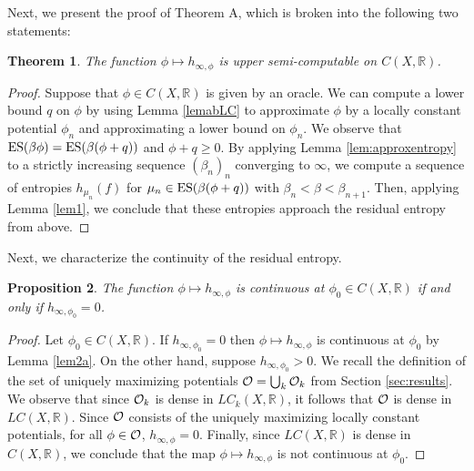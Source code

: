 \documentclass[11pt, reqno]{amsart}
\newtheorem{theorem}{Theorem}[section]
\newtheorem{proposition}[theorem]{Proposition}
\newcommand{\bR}{{\mathbb R}}
\def\ES{{\rm ES}}
\begin{document}
Next, we present the proof of Theorem A, which is broken into the following two statements:

\begin{theorem}\label{halfThmA}
The function $\phi\mapsto h_{\infty,\phi}$ is upper semi-computable on $C(X,\bR)$.
\end{theorem}
\begin{proof}
Suppose that $\phi\in C(X,\bR)$ is given by an oracle.  We can compute a lower bound $q$ on $\phi$ by using Lemma \ref{lemabLC} to approximate $\phi$ by a locally constant potential $\phi_n$ and approximating a lower bound on $\phi_n$.  We observe that $\ES(\beta\phi)=\ES(\beta(\phi+q))$ and $\phi+q\geq 0$.  By applying Lemma \ref{lem:approxentropy} to a strictly increasing sequence $(\beta_n)_n$ converging to $\infty$, we compute a sequence of entropies $h_{\mu_n}(f)$ for $\mu_n\in\ES(\beta(\phi+q))$ with $\beta_n<\beta<\beta_{n+1}$.  Then, applying Lemma \ref{lem1}, we conclude that these entropies approach the residual entropy from above.
\end{proof}
Next, we characterize the continuity of the residual entropy. 
\begin{proposition}\label{prop0acomp}
The function  $\phi\mapsto h_{\infty,\phi}$ is continuous at $\phi_0\in C(X,\bR)$ if and only if $h_{\infty,\phi_0}=0$.
\end{proposition}
\begin{proof}
Let $\phi_0\in C(X,\bR)$. If $h_{\infty,\phi_0}=0$ then $\phi\mapsto h_{\infty,\phi}$ is continuous at $\phi_0$ by Lemma \ref{lem2a}.
On the other hand, suppose $h_{\infty,\phi_0}>0$.  We recall the definition of the set of uniquely maximizing potentials $\mathcal O=\bigcup_k \mathcal O_k$ from Section \ref{sec:results}.  We observe that since $\mathcal O_k$ is dense in $LC_k(X,\bR)$, it follows that $\mathcal O$ is dense in $LC(X,\bR)$.  Since $\mathcal O$ consists of the uniquely maximizing locally constant potentials, for all $\phi\in\mathcal O$, $h_{\infty,\phi}=0$.  Finally, since $LC(X,\bR)$ is dense in $C(X,\bR)$, we conclude that the map $\phi\mapsto h_{\infty,\phi}$ is not continuous at $\phi_0$.
\end{proof}
\end{document}
